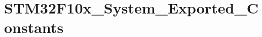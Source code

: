 \hypertarget{group___s_t_m32_f10x___system___exported___constants}{\section{S\-T\-M32\-F10x\-\_\-\-System\-\_\-\-Exported\-\_\-\-Constants}
\label{group___s_t_m32_f10x___system___exported___constants}
}
